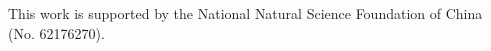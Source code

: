 \documentclass[sigconf]{acmart}
\begin{document}
\begin{acks}
This work is supported by the National Natural Science Foundation of China (No. 62176270).
\end{acks}


%



\end{document}
